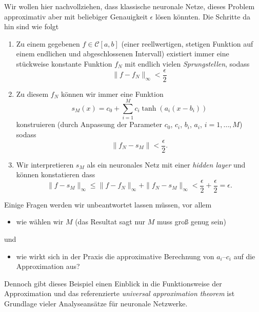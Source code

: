 \documentclass[
]{book}
\providecommand{\tightlist}{%
  \setlength{\itemsep}{0pt}\setlength{\parskip}{0pt}}
\theoremstyle{definition}
\theoremstyle{definition}
\theoremstyle{definition}
\theoremstyle{definition}
\theoremstyle{remark}
\begin{document}
Wir wollen hier nachvollziehen, dass klassische neuronale Netze, dieses Problem
approximativ aber mit beliebiger Genauigkeit \(\epsilon\) lösen könnten. Die
Schritte da hin sind wie folgt

\begin{enumerate}
\def\labelenumi{\arabic{enumi}.}
\item
  Zu einem gegebenen \(f\in \mathcal C[a, b]\) (einer reellwertigen, stetigen Funktion
  auf einem
  endlichen und abgeschlossenen Intervall) existiert immer eine stückweise
  konstante Funktion \(f_N\) mit endlich vielen \emph{Sprungstellen}, sodass
  \begin{equation*}
  \|f-f_N\|_\infty < \frac \epsilon2
  \end{equation*}
\item
  Zu diesem \(f_N\) können wir immer eine Funktion
  \begin{equation*}
  s_M(x) = c_0 + \sum_{i=1}^Mc_i \tanh (a_i(x - b_i))
  \end{equation*}
  konstruieren (durch Anpassung der Parameter \(c_0\), \(c_i\), \(b_i\), \(a_i\),
  \(i=1,\dotsc, M\)) sodass
  \begin{equation*}
  \|f_N-s_M\| < \frac \epsilon2.
  \end{equation*}
\item
  Wir interpretieren \(s_M\) als ein neuronales Netz mit einer \emph{hidden layer} und
  können konstatieren dass
  \begin{equation*}
  \|f-s_M\|_\infty \leq \|f-f_N\|_\infty + \|f_N-s_M\|_\infty < \frac \epsilon2
  + \frac \epsilon2 = \epsilon.
  \end{equation*}
\end{enumerate}

Einige Fragen werden wir unbeantwortet lassen müssen, vor allem

\begin{itemize}
\tightlist
\item
  wie wählen wir \(M\) (das Resultat sagt nur \(M\) muss groß genug
  sein)
\end{itemize}

und

\begin{itemize}
\tightlist
\item
  wie wirkt sich in der Praxis die approximative Berechnung von \(a_i\)--\(c_i\)
  auf die Approximation aus?
\end{itemize}

Dennoch gibt dieses Beispiel einen Einblick in die Funktionsweise der
Approximation und das referenzierte \emph{universal
approximation theorem} ist Grundlage vieler Analyseansätze für
neuronale Netzwerke.
\end{document}
